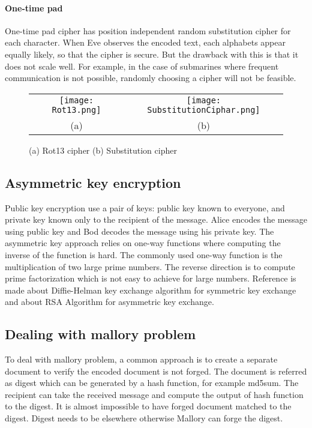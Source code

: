 \documentclass[twoside]{article}
\begin{document}
\paragraph{One-time pad} One-time pad cipher has position independent random substitution cipher for each character. When Eve observes the encoded text, each alphabets appear equally likely, so that the cipher is secure. But the drawback with this is that it does not scale well. For example, in the case of submarines where frequent communication is not possible, randomly choosing a cipher will not be feasible.

\begin{figure}[h]
\begin{center}
\begin{tabular}{c|c}
  \texttt{[image: Rot13.png]} &
  \texttt{[image: SubstitutionCiphar.png]} \\
  (a) &
  (b) \\
\end{tabular}
\end{center}
\caption{\label{f:ciphar}(a) Rot13 cipher (b) Substitution cipher}
\end{figure}

\subsection{Asymmetric key encryption}
Public key encryption use a pair of keys: public key known to everyone, and private key known only to the recipient of the message. Alice encodes the message using public key and Bod decodes the message using his private key. The asymmetric key approach relies on one-way functions where computing the inverse of the function is hard. The commonly used one-way function is the multiplication of two large prime numbers. The reverse direction is to compute prime factorization which is not easy to achieve for large numbers.
Reference is made about Diffie-Helman key exchange algorithm for symmetric key exchange and about RSA Algorithm for asymmetric key exchange. 
\subsection{Dealing with mallory problem}
To deal with mallory problem, a common approach is to create a separate document to verify the encoded document is not forged. The document is referred as digest which can be generated by a hash function, for example md5sum. The recipient can take the received message and compute the output of hash function to the digest. It is almost impossible to have forged document matched to the digest. Digest needs to be elsewhere otherwise Mallory can forge the digest. 
\end{document}
